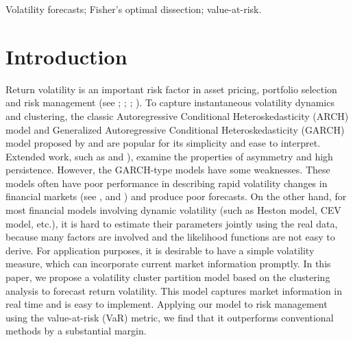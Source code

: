 \documentclass[preprint,12pt,authoryear]{elsarticle}
\begin{document}
\begin{frontmatter}
\begin{keyword}
Volatility forecasts; Fisher's optimal dissection;
value-at-risk. %
\end{keyword}


\end{frontmatter}

\section{Introduction} %
\label{sec:Introduction} Return volatility is an important risk factor in asset pricing, portfolio selection and risk management (see \cite{Angelini2019}; \cite{Schmitt2017}; \cite{Engle2018}; \cite{Chen2019}). To capture instantaneous volatility dynamics and clustering, the classic Autoregressive Conditional Heteroskedasticity (ARCH) model and Generalized Autoregressive Conditional Heteroskedasticity (GARCH) model proposed  by \cite{Engle1982} and \cite{Bollerslev1986} are popular for its simplicity and ease to interpret. Extended work, such as \cite{Nelson1991} and \cite{Engle1993}), examine the properties of asymmetry and high persistence.
However, the GARCH-type models have some weaknesses. These models often
have poor performance in describing rapid volatility changes in financial markets (see \cite{Andersen2003}, \cite{Hansen2012} and \cite{Smetanina2021}) and produce poor forecasts.
On the other hand,
for most financial models involving dynamic volatility (such as Heston model, CEV model, etc.), it is hard to estimate their parameters jointly using the real data, because many factors are involved and the likelihood functions are not easy to derive.
For application purposes, it is desirable to have a simple volatility measure, which can incorporate current market information promptly. In this paper, we propose a volatility cluster partition model based on the clustering analysis to forecast return volatility. This model captures market information in real time and is easy to implement. Applying our model to risk management using the value-at-risk (VaR) metric, we find that it outperforms conventional methods by a substantial margin.

\end{document}
